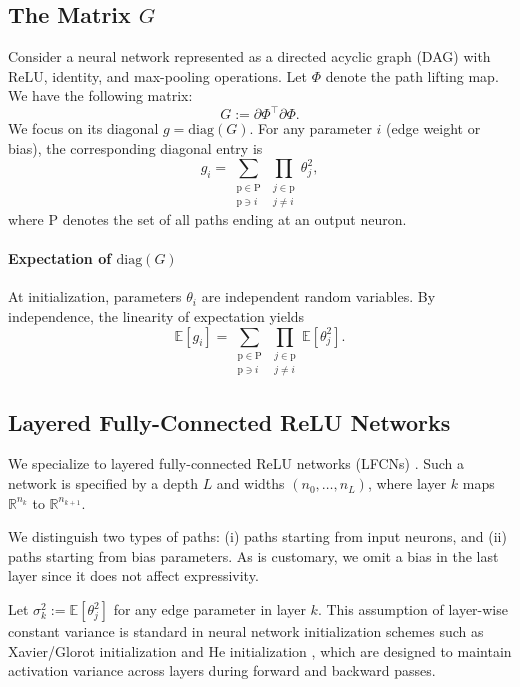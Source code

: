 \documentclass{article}
\theoremstyle{plain}
\theoremstyle{definition}
\theoremstyle{remark}
\def\path{{\mathrm{p}}}
\def\pathset{{\mathrm{P}}}
\begin{document}
\subsection{The  Matrix $G$}

Consider a neural network represented as a directed acyclic graph (DAG) with ReLU, identity, and max-pooling operations. Let $\Phi$ denote the path lifting map. We have the following matrix:
\[
G := \partial \Phi^\top \partial \Phi.
\]
We focus on its diagonal $g = \mathrm{diag}(G)$.
For any parameter $i$ (edge weight or bias), the corresponding diagonal entry is
\begin{equation}
\label{eq:path-magnitude}
g_i = \sum_{\substack{\path \in \pathset\\ \path\ni i}} \prod_{\substack{j \in \path\\ j \neq i}} \theta_j^2,
\end{equation}
where $\pathset$ denotes the set of all paths ending at an output neuron.

\paragraph{Expectation of $\mathrm{diag}(G)$}
At initialization, parameters $\theta_i$ are independent random variables. By independence, the linearity of expectation yields
\begin{equation}
\label{eq:expected-gi}
\mathbb{E}[g_i] = \sum_{\substack{\path \in \pathset\\ \path\ni i}} \prod_{\substack{j \in \path\\ j \neq i}} \mathbb{E}[\theta_j^2].
\end{equation}

\subsection{Layered Fully-Connected ReLU Networks}
\label{app:LFCN}
We specialize to layered fully-connected ReLU networks (LFCNs) \citep{gonon2023path}. Such a network is specified by a depth $L$ and widths $(n_0,\dots,n_L)$, where layer $k$ maps $\mathbb{R}^{n_k}$ to $\mathbb{R}^{n_{k+1}}$.

We distinguish two types of paths: (i) paths starting from input neurons, and (ii) paths starting from bias parameters. As is customary, we omit a bias in the last layer since it does not affect expressivity.

Let $\sigma_k^2 := \mathbb{E}[\theta_j^2]$ for any edge parameter in layer $k$. This assumption of layer-wise constant variance is standard in neural network initialization schemes such as Xavier/Glorot initialization \citep{glorot2010understanding} and He initialization \citep{he2015delving}, which are designed to maintain activation variance across layers during forward and backward passes.
\end{document}

